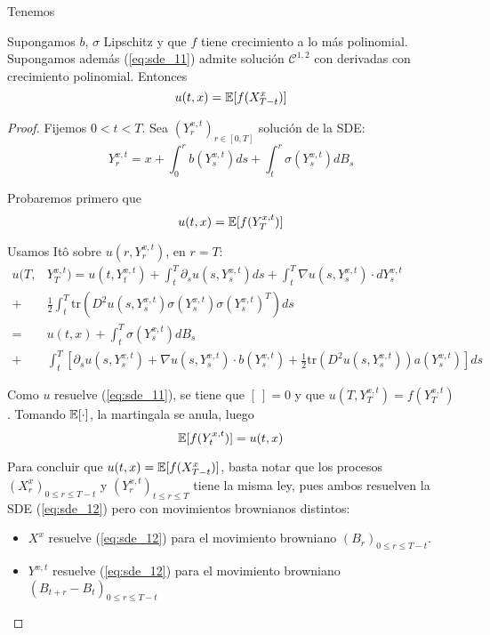 Tenemos 
\begin{theorem}
        Supongamos $b$, $\sigma$ Lipschitz y que $f$ tiene crecimiento a lo más 
        polinomial. Supongamos además (\ref{eq:sde_11}) admite solución $\mathcal{C}^{1,2}$ 
        con derivadas con crecimiento polinomial. Entonces 
        \begin{equation*}
                u(t,x) = \mathbb{E}[ f (X_{T-t}^{x})]
        \end{equation*}
\end{theorem}
 \begin{proof}
\gris
 Fijemos $0 < t < T$. Sea $(Y_{r}^{x,t})_{r \in [0,T]}$ solución de la SDE: 
 \begin{equation*}
         Y_{r}^{x,t} = x + \int_{0}^{r} b(Y_{s}^{x,t})ds + \int_{t}^{r} \sigma (Y_{s}^{x,t}) dB_s
 \end{equation*}

Probaremos primero que
\begin{equation*}
u(t,x) = \mathbb{E} [f (Y_T^{x,t})]
\end{equation*}

 Usamos It\^{o} sobre $u(r,Y_r^{x,t})$, en $r = T$:
 \begin{align*}
         u(T, &Y_T^{x,t}) 
         =  u(t,Y_t^{x,t}) + \int_{t}^{T} \partial_s u(s,Y_s^{x,t}) ds 
         + \int_{t}^{T} \nabla u (s, Y_s^{x,t}) \cdot dY_s^{x,t} \\
          + & \frac{1}{2} \int_{t}^{T} \text{tr} (D^2 u(s,Y_s^{x,t})
         \sigma(Y_s^{x,t})\sigma(Y_s^{x,t})^{T}) ds \\ 
         = ~ & u(t,x) + \int_{t}^{T} \sigma(Y_s^{x,t}) dB_s \\
         + & \int_{t}^{T} \left[ 
         \partial_s u (s, Y_s^{x,t}) + \nabla u(s,Y_s^{x,t}) \cdot  b(Y_s^{x,t}) 
         + \frac{1}{2} \text{tr}(D^2 u (s, Y_s^{x,t}))a(Y_s^{x,t})
         \right] ds
 \end{align*}
 
 Como $u$ resuelve (\ref{eq:sde_11}), se tiene que $[ ~ ] = 0$ y que
 $u(T,Y_{T}^{x,t}) = f(Y_T^{x,t})$. Tomando $\mathbb{E}[\cdot]$, la martingala se anula, luego 
 \begin{equation*}
         \mathbb{E} [f(Y_{t}^{x,t})] = u(t,x)
 \end{equation*}

 Para concluir que $u(t,x) = \mathbb{E} [f(X_{T-t}^{x})]$, basta notar que los procesos 
 $(X_r^{x})_{0 \le r \le T-t}$ y $(Y_r^{x,t})_{t \le  r \le T}$ tiene la misma ley, pues
 ambos resuelven la SDE (\ref{eq:sde_12}) pero con movimientos brownianos distintos: 
 \begin{itemize}
         \item $X^x$ resuelve (\ref{eq:sde_12}) para el movimiento browniano 
                 $(B_{r})_{0 \le r \le T - t}$. 
         \item $Y^{x,t}$ resuelve (\ref{eq:sde_12}) para el movimiento browniano 
                 $(B_{t+r} - B_t)_{0 \le  r \le  T-t}$ 
 \end{itemize}


\end{proof}
